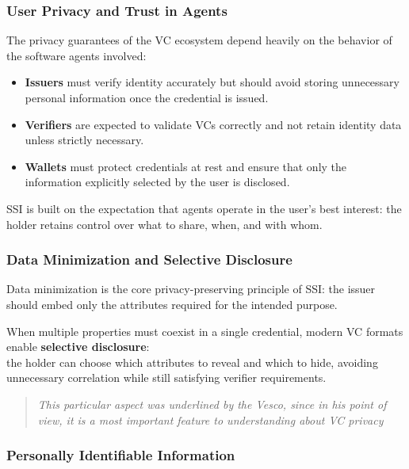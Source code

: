 \subsubsection *{User Privacy and Trust in Agents}

\noindent
The privacy guarantees of the VC ecosystem depend heavily on the behavior of the software agents involved:

\begin{itemize}
    \item \textbf{Issuers} must verify identity accurately but should avoid storing unnecessary
    personal information once the credential is issued.
    \item \textbf{Verifiers} are expected to validate VCs correctly and not retain identity data
    unless strictly necessary.
    \item \textbf{Wallets} must protect credentials at rest and ensure that only the information
    explicitly selected by the user is disclosed.
\end{itemize}

\noindent
SSI is built on the expectation that agents operate in the user’s best interest: the holder retains control over what to share, when, and with whom.

\subsubsection *{Data Minimization and Selective Disclosure}

Data minimization is the core privacy-preserving principle of SSI:
the issuer should embed only the attributes required for the intended purpose.
\medskip

\noindent
When multiple properties must coexist in a single credential, modern VC formats enable \textbf{selective disclosure}:\\
the holder can choose which attributes to reveal and which to hide, avoiding unnecessary correlation while still satisfying verifier requirements.

\begin{quotation}
  \textit{This particular aspect was underlined by the Vesco, since in his point of view, it is a most important feature to understanding about VC privacy}
\end{quotation}

\subsubsection *{Personally Identifiable Information}

